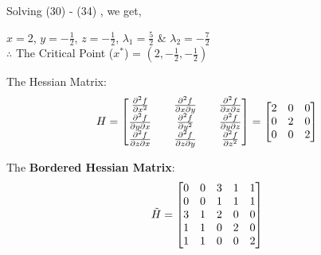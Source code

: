 \documentclass[12pt, letterpaper]{article}
\begin{document}
Solving (30) - (34) , we get,

$x=2$, $y=-\frac{1}{2}$, $z=-\frac{1}{2}$, $\lambda_1 = \frac{5}{2}$ \& $\lambda_2=-\frac{7}{2}$\\


$\therefore$ The\hspace{0.1cm} Critical\hspace{0.1cm} Point ($x^*$) = $(2,-\frac{1}{2},-\frac{1}{2})$


The Hessian Matrix: 
\begin{equation}
    H = \begin{bmatrix}
    \pdv[2]{f}{x} && \pdv{f}{x}{y} && \pdv{f}{x}{z} \\
    \pdv{f}{y}{x} && \pdv[2]{f}{y} && \pdv{f}{y}{z} \\
    \pdv{f}{z}{x} && \pdv{f}{z}{y} && \pdv[2]{f}{z} 
    \end{bmatrix} = \begin{bmatrix}
    2 & 0 & 0 \\ 0 & 2 & 0 \\ 0 & 0 & 2
    \end{bmatrix}
\end{equation}

The \textbf{Bordered Hessian Matrix}:
\begin{equation}
    \Tilde{H} = 
    \begin{bmatrix}
    0 & 0 & 3 & 1 & 1 \\ 0 & 0 & 1 & 1 & 1 \\ 3 & 1 & 2 & 0 & 0 \\ 1 & 1 & 0 & 2 & 0 \\ 1 & 1 & 0 & 0 & 2
    \end{bmatrix}
\end{equation}
\end{document}
